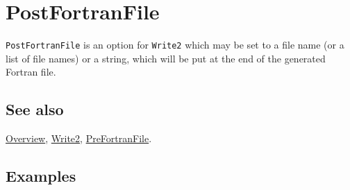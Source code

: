 \documentclass[../FeynCalcManual.tex]{subfiles}
\begin{document}
\hypertarget{postfortranfile}{%
\section{PostFortranFile}\label{postfortranfile}}

\texttt{PostFortranFile} is an option for \texttt{Write2} which may be
set to a file name (or a list of file names) or a string, which will be
put at the end of the generated Fortran file.

\subsection{See also}

\hyperlink{toc}{Overview}, \hyperlink{write2}{Write2},
\hyperlink{prefortranfile}{PreFortranFile}.

\subsection{Examples}
\end{document}
